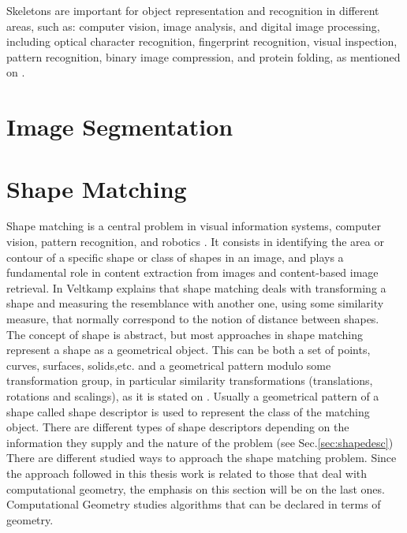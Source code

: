 Skeletons are important for object representation and recognition in different areas,
such as:   computer vision, image analysis, and digital image processing, 
including optical character recognition, fingerprint recognition, visual inspection,
 pattern recognition, binary image compression, and protein folding, as mentioned
on \cite{skprotein}.


\section{Image Segmentation}
\label{sec:segmentation}


\section{Shape Matching}
\label{sec:shapefitting}

Shape matching is a central problem in visual information systems,
computer vision, pattern recognition, and robotics \cite{matchingbook}. 
It consists in identifying the area or contour of a specific
 shape or class of shapes in an image, and plays a fundamental
role in content extraction from images and content-based image
retrieval. In \cite{matching2} Veltkamp explains that shape 
matching deals with transforming a shape and measuring the 
resemblance with another one, using some similarity measure, that 
normally correspond to the notion of distance between shapes.\\
The concept of shape is abstract, but most approaches in 
shape matching represent a shape as a geometrical object.
This can be both a set of points, curves, surfaces, solids,etc.
and a geometrical pattern modulo some transformation group,
in particular similarity transformations (translations, rotations 
and scalings), as it is stated on \cite{matching2}. Usually a
geometrical pattern of a shape called shape descriptor
is used to represent the class of the matching object. There are
different types of shape descriptors depending on the information
they supply and the nature of the problem (see Sec.\ref{sec:shapedesc}) \\

There are different studied ways to approach the shape matching 
problem. Since the approach followed in this thesis work
is related to those that deal with computational geometry, the
emphasis on this section will be on the last ones. Computational
Geometry studies algorithms that can be declared in terms of 
geometry.\\

